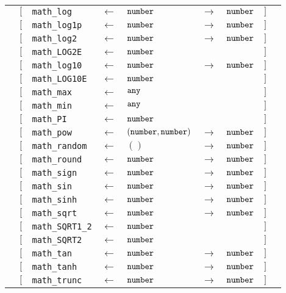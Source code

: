 \begin{tabular}[fragile]{lllllllll}
& $[$ & \texttt{math\_log} & $\leftarrow$  & $\texttt{number}$ & $\rightarrow$ & $\texttt{number}$ & $]$ \\
& $[$ & \texttt{math\_log1p} & $\leftarrow$  & $\texttt{number}$ & $\rightarrow$ & $\texttt{number}$ & $]$ \\
& $[$ & \texttt{math\_log2} & $\leftarrow$  & $\texttt{number}$ & $\rightarrow$ & $\texttt{number}$ & $]$ \\
& $[$ & \texttt{math\_LOG2E} & $\leftarrow$  & $\texttt{number}$ & & & $]$ \\
& $[$ & \texttt{math\_log10} & $\leftarrow$  & $\texttt{number}$ & $\rightarrow$ & $\texttt{number}$ & $]$ \\
& $[$ & \texttt{math\_LOG10E} & $\leftarrow$  & $\texttt{number}$ & & & $]$ \\
& $[$ & \texttt{math\_max} & $\leftarrow$  & $\texttt{any}$ & & & $]$ \\
& $[$ & \texttt{math\_min} & $\leftarrow$  & $\texttt{any}$ & & & $]$ \\
& $[$ & \texttt{math\_PI} & $\leftarrow$  & $\texttt{number}$ & & & $]$ \\
& $[$ & \texttt{math\_pow} & $\leftarrow$  & $(\texttt{number}, \texttt{number})$ & $\rightarrow$ & $\texttt{number}$ & $]$ \\
& $[$ & \texttt{math\_random} & $\leftarrow$  & $()$ & $\rightarrow$ & $\texttt{number}$ & $]$ \\
& $[$ & \texttt{math\_round} & $\leftarrow$  & $\texttt{number}$ & $\rightarrow$ & $\texttt{number}$ & $]$ \\
& $[$ & \texttt{math\_sign} & $\leftarrow$  & $\texttt{number}$ & $\rightarrow$ & $\texttt{number}$ & $]$ \\
& $[$ & \texttt{math\_sin} & $\leftarrow$  & $\texttt{number}$ & $\rightarrow$ & $\texttt{number}$ & $]$ \\
& $[$ & \texttt{math\_sinh} & $\leftarrow$  & $\texttt{number}$ & $\rightarrow$ & $\texttt{number}$ & $]$ \\
& $[$ & \texttt{math\_sqrt} & $\leftarrow$  & $\texttt{number}$ & $\rightarrow$ & $\texttt{number}$ & $]$ \\
& $[$ & \texttt{math\_SQRT1\_2} & $\leftarrow$  & $\texttt{number}$ & & & $]$ \\
& $[$ & \texttt{math\_SQRT2} & $\leftarrow$  & $\texttt{number}$ & & & $]$ \\
& $[$ & \texttt{math\_tan} & $\leftarrow$  & $\texttt{number}$ & $\rightarrow$ & $\texttt{number}$ & $]$ \\
& $[$ & \texttt{math\_tanh} & $\leftarrow$  & $\texttt{number}$ & $\rightarrow$ & $\texttt{number}$ & $]$ \\
& $[$ & \texttt{math\_trunc} & $\leftarrow$  & $\texttt{number}$ & $\rightarrow$ & $\texttt{number}$ & $]$ \\

\end{tabular}
